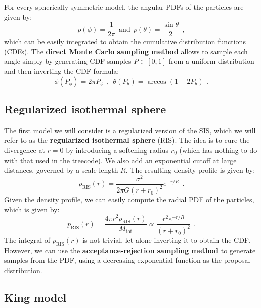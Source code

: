 \documentclass[fleqn,usenatbib]{mnras}
\begin{document}
For every spherically symmetric model, the angular PDFs of the particles are given by:
\begin{equation}
    p(\phi) = \dfrac{1}{2 \pi} \:\: \text{and} \:\: p(\theta) = \dfrac{\sin \theta}{2}  \:\: ,
    \label{eq:angular_pdf}
\end{equation}
which can be easily integrated to obtain the cumulative distribution functions (CDFs).
The \textbf{direct Monte Carlo sampling method} allows to sample each angle simply by generating CDF samples $P \in [0,1]$ from a uniform distribution and then inverting the CDF formula:
\begin{equation}
    \phi(P_\phi) = 2 \pi P_\phi \:\: , \:\: \theta(P_\theta) = \arccos\left(1 - 2 P_\theta\right) \:\: .
    \label{eq:angular_sampling}
\end{equation}

\subsection{Regularized isothermal sphere}\label{sec:isothermal_sphere}
The first model we will consider is a regularized version of the SIS, which we will refer to as the \textbf{regularized isothermal sphere} (RIS).
The idea is to cure the divergence at $r=0$ by introducing a softening radius $r_0$ (which has nothing to do with that used in the treecode).
We also add an exponential cutoff at large distances, governed by a scale length $R$.
The resulting density profile is given by:
\begin{equation}
    \rho_\text{RIS}(r) = \dfrac{\sigma^2}{2 \pi G \left(r + r_0\right)^2} e^{-r/R} \:\: .
    \label{eq:ris_density}
\end{equation}
Given the density profile, we can easily compute the radial PDF of the particles, which is given by:
\begin{equation}
    p_\text{RIS}(r) = \dfrac{4\pi r^2 \rho_\text{RIS}(r)}{M_\text{tot}} \propto \dfrac{r^2 e^{-r/R}}{\left(r + r_0\right)^2} \:\: .
    \label{eq:ris_pdf}
\end{equation}
The integral of $p_\text{RIS}(r)$ is not trivial, let alone inverting it to obtain the CDF.
However, we can use the \textbf{acceptance-rejection sampling method} to generate samples from the PDF, using a decreasing exponential function as the proposal distribution.


\subsection{King model}\label{sec:King_model}
\end{document}
